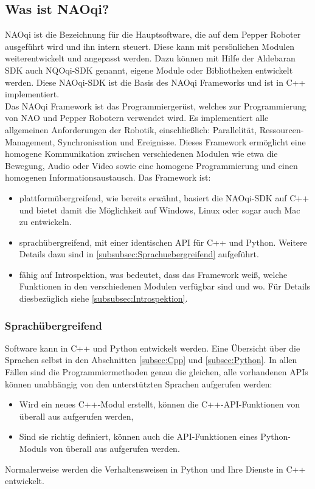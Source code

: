 \subsection{Was ist NAOqi?}\label{subsec:WasIstNAOqi}
NAOqi ist die Bezeichnung für die Hauptsoftware, die auf dem Pepper Roboter ausgeführt wird und ihn intern steuert. Diese kann mit persönlichen Modulen weiterentwickelt und angepasst werden. Dazu können mit Hilfe der Aldebaran \ac{SDK} auch NQOqi-\ac{SDK} genannt, eigene Module oder Bibliotheken entwickelt werden. Diese NAOqi-\ac{SDK} ist die Basis des NAOqi Frameworks und ist in C++ implementiert\cite{nao_dev_install_guide}.
\\

\noindent
Das NAOqi Framework ist das Programmiergerüst, welches zur Programmierung von NAO und Pepper Robotern verwendet wird. Es implementiert alle allgemeinen Anforderungen der Robotik, einschließlich: Parallelität, Ressourcen-Management, Synchronisation und Ereignisse. Dieses Framework ermöglicht eine homogene Kommunikation zwischen verschiedenen Modulen wie etwa die Bewegung, Audio oder Video sowie eine homogene Programmierung und einen homogenen Informationsaustausch. Das Framework ist:\\
\begin{itemize}
    \item plattformübergreifend, wie bereits erwähnt, basiert die NAOqi-\ac{SDK} auf C++ und bietet damit die Möglichkeit auf Windows, Linux oder sogar auch Mac zu entwickeln.
    \item sprachübergreifend, mit einer identischen API für C++ und Python. Weitere Details dazu sind in \autoref{subsubsec:Sprachuebergreifend} aufgeführt.
    \item fähig auf Introspektion, was bedeutet, dass das Framework weiß, welche Funktionen in den verschiedenen Modulen verfügbar sind und wo. Für Details diesbezüglich siehe \autoref{subsubsec:Introspektion}.
\end{itemize}

\subsubsection{Sprachübergreifend}\label{subsubsec:Sprachuebergreifend}
Software kann in C++ und Python entwickelt werden. Eine Übersicht über die Sprachen selbst in den Abschnitten \autoref{subsec:Cpp} und \autoref{subsec:Python}. In allen Fällen sind die Programmiermethoden genau die gleichen, alle vorhandenen \acp{API} können unabhängig von den unterstützten Sprachen aufgerufen werden:\\
\begin{itemize}
    \item Wird ein neues C++-Modul erstellt, können die C++-\ac{API}-Funktionen von überall aus aufgerufen werden,
    \item Sind sie richtig definiert, können auch die \ac{API}-Funktionen eines Python-Moduls von überall aus aufgerufen werden.
\end{itemize}
Normalerweise werden die Verhaltensweisen in Python und Ihre Dienste in C++ entwickelt.\\

